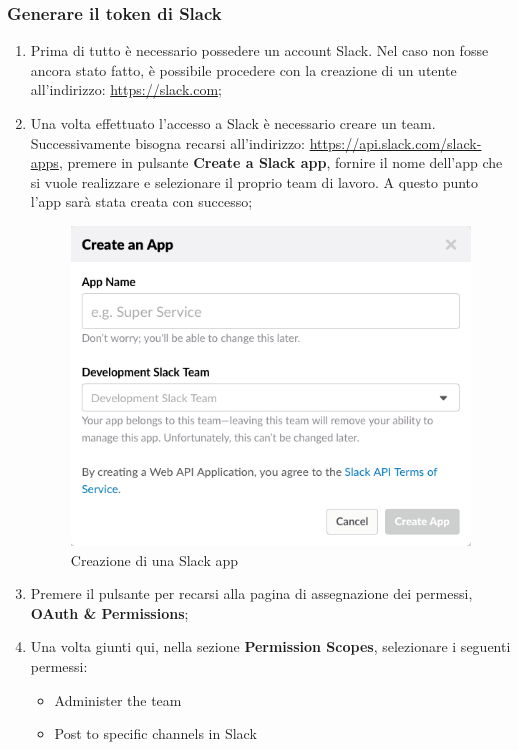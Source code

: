 \documentclass[../ManualeSviluppatore_v1.0.0.tex]{subfiles}
\begin{document}
		\subsubsection{Generare il \gls{token} di Slack}
			\begin{enumerate}
				\item Prima di tutto è necessario possedere un account Slack. Nel caso non fosse ancora stato fatto, è possibile procedere con la creazione di un utente all'indirizzo: \url{https://slack.com};
				\item Una volta effettuato l'accesso a Slack è necessario creare un team. Successivamente bisogna recarsi all'indirizzo: \url{https://api.slack.com/slack-apps}, premere in pulsante \textbf{Create a Slack app}, fornire il nome dell'app che si vuole realizzare e selezionare il proprio team di lavoro. A questo punto l'app sarà stata creata con successo;
				\begin{figure}[!h]
					\centering
					\includegraphics[scale=0.54]{Screenshot/CreateSlack.png}
					\caption{Creazione di una Slack app}
				\end{figure}
				\item Premere il pulsante per recarsi alla pagina di assegnazione dei permessi, \textbf{OAuth \& Permissions};
				\newpage
				\item Una volta giunti qui, nella sezione \textbf{Permission Scopes}, selezionare i seguenti permessi:
					\begin{itemize}
					\item Administer the team
					\item Post to specific channels in Slack

\end{itemize}
\end{enumerate}
\end{document}
